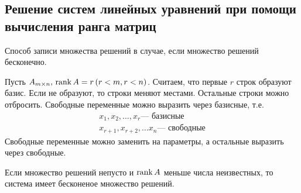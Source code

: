 \documentclass[12pt, a4paper]{article}
\begin{document}
    \subsection{Решение систем линейных уравнений при помощи вычисления ранга матриц}
    Способ записи множества решений в случае, если множество решений бесконечно. 

    Пусть \( A_{m\times n}, \, \operatorname{rank} A = r \, (r < m, r < n) \). Считаем, что первые \( r \) строк образуют базис. Если не образуют, то строки меняют местами. Остальные строки можно отбросить. Свободные переменные можно выразить через базисные, т.е. 
    \begin{align*}
        x_{1}, x_{2}, \ldots , x_{r} \text{--- базисные} \\
        x_{r+1}, x_{r+2}, \ldots x_{n} \text{--- свободные}
    \end{align*}
    Свободные переменные можно заменить на параметры, а остальные выразить через свободные.
    \begin{rem}
        Если множество решений непусто и \( \operatorname{rank} A \) меньше числа неизвестных, то система имеет бесконеное множество решений.
    \end{rem}
\end{document}
